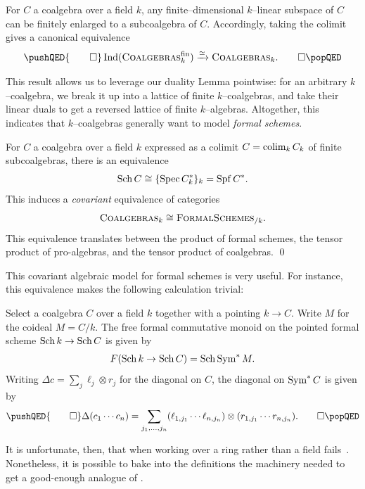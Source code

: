 \begin{lemma}\label{kCoalgebrasAreIndFinite}
For \(C\) a coalgebra over a field \(k\), any finite--dimensional \(k\)--linear subspace of \(C\) can be finitely enlarged to a subcoalgebra of \(C\).
Accordingly, taking the colimit gives a canonical equivalence
\[\pushQED{\qed}
\Ind(\CatOf{Coalgebras}_k^{\mathrm{fin}}) \xrightarrow{\simeq} \CatOf{Coalgebras}_k. \qedhere
\popQED\]
\end{lemma}

\noindent This result allows us to leverage our duality Lemma pointwise: for an arbitrary \(k\)--coalgebra, we break it up into a lattice of finite \(k\)--coalgebras, and take their linear duals to get a reversed lattice of finite \(k\)--algebras.
Altogether, this indicates that \(k\)--coalgebras generally want to model \emph{formal schemes}.

\begin{corollary}\label{CoalgsAndFSchsAgreeOverk}
For \(C\) a coalgebra over a field \(k\) expressed as a colimit \(C = \operatorname*{colim}_k C_k\) of finite subcoalgebras, there is an equivalence \[\operatorname{Sch} C \cong \{\operatorname{Spec} C_k^*\}_k = \operatorname{Spf} C^*.\]
This induces a \emph{covariant} equivalence of categories \[\normalfont\textsc{Coalgebras}_k \cong \normalfont\textsc{FormalSchemes}_{/k}.\]
This equivalence translates between the product of formal schemes, the tensor product of pro-algebras, and the tensor product of coalgebras. \qed
\end{corollary}

This covariant algebraic model for formal schemes is very useful.
For instance, this equivalence makes the following calculation trivial:
\begin{lemma}
Select a coalgebra \(C\) over a field \(k\) together with a pointing \(k \to C\).
Write \(M\) for the coideal \(M = C / k\).
The free formal commutative monoid on the pointed formal scheme \(\operatorname{Sch} k \to \operatorname{Sch} C\) is given by \[F(\operatorname{Sch} k \to \operatorname{Sch} C) = \operatorname{Sch} \operatorname{Sym}^* M.\]
Writing \(\Delta c = \sum_j \ell_j \otimes r_j\) for the diagonal on \(C\), the diagonal on \(\operatorname{Sym}^* C\) is given by
\[\pushQED{\qed}
\Delta(c_1 \cdots c_n) = \sum_{j_1, \ldots, j_n} (\ell_{1,j_1} \cdots \ell_{n, j_n}) \otimes (r_{1, j_1} \cdots r_{n, j_n}). \qedhere
\popQED\]
\end{lemma}

It is unfortunate, then, that when working over a ring rather than a field  fails~\cite[Appendix 5.3]{Michaelis}.
Nonetheless, it is possible to bake into the definitions the machinery needed to get a good-enough analogue of .

